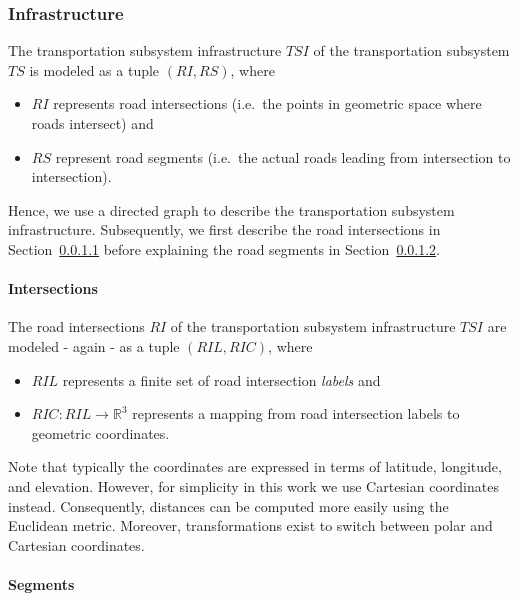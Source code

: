 \subsubsection{Infrastructure}
\label{transport_infrastructure}

The transportation subsystem infrastructure $TSI$ of the transportation subsystem $TS$ is modeled as a tuple $(RI, RS)$, where
\begin{itemize}
	\item $RI$ represents road intersections (i.e.\ the points in geometric space where roads intersect) and
	\item $RS$ represent road segments (i.e.\ the actual roads leading from intersection to intersection).
\end{itemize}
Hence, we use a directed graph to describe the transportation subsystem infrastructure. Subsequently, we first describe the road intersections in Section~\ref{intersections} before explaining the road segments in Section~\ref{segments}.

\paragraph{Intersections}
\label{intersections}

The road intersections $RI$ of the transportation subsystem infrastructure $TSI$ are modeled - again - as a tuple $(RIL, RIC)$, where
\begin{itemize}
	\item $RIL$ represents a finite set of road intersection \textit{labels} and
	\item $RIC: RIL \rightarrow \mathbb{R}^3$ represents a mapping from road intersection labels to geometric coordinates.
\end{itemize}
Note that typically the coordinates are expressed in terms of latitude, longitude, and elevation. However, for simplicity in this work we use Cartesian coordinates instead. Consequently, distances can be computed more easily using the Euclidean metric. Moreover, transformations exist to switch between polar and Cartesian coordinates.

\paragraph{Segments}
\label{segments}

